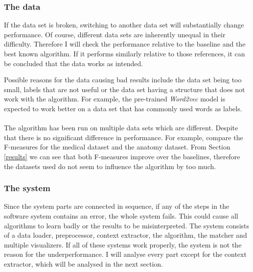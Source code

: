 \documentclass{article}
\begin{document}
  \subsubsection{The data}
  If the data set is broken, switching to another data set will substantially change performance. Of course, different data sets are inherently unequal in their difficulty. Therefore I will check the performance relative to the baseline and the best known algorithm. If it performs similarly relative to those references, it can be concluded that the data works as intended.

  Possible reasons for the data causing bad results include the data set being too small, labels that are not useful or the data set having a structure that does not work with the algorithm. For example, the pre-trained \emph{Word2vec} model is expected to work better on a data set that has commonly used words as labels. %
  \paragraph{}
 The algorithm has been run on multiple data sets which are different. Despite that there is no significant difference in performance. For example, compare the F-measures for the medical dataset and the anatomy dataset. From Section \ref{results} we can see that both F-measures improve over the baselines, therefore the datasets used do not seem to influence the algorithm by too much.
 
  \subsubsection{The system}
  Since the system parts are connected in sequence, if any of the steps in the software system contains an error, the whole system fails. This could cause all algorithms to learn badly or the results to be misinterpreted. The system consists of a data loader, preprocessor, context extractor, the algorithm, the matcher and multiple visualizers. If all of these systems work properly, the system is not the reason for the underperformance. I will analyse every part except for the context extractor, which will be analysed in the next section.
  
\end{document}
